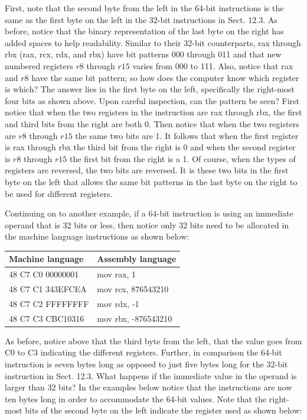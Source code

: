 \documentclass[10pt]{book}
\begin{document}
First, note that the second byte from the left in the 64-bit instructions is the same as the first byte on the left in the 32-bit instructions in Sect. 12.3. As before, notice that the binary representation of the last byte on the right has added spaces to help readability. Similar to their 32-bit counterparts, rax through rbx (rax, rcx, rdx, and rbx) have bit patterns 000 through 011 and that new numbered registers $r 8$ through $r 15$ varies from 000 to 111. Also, notice that rax and $r 8$ have the same bit pattern; so how does the computer know which register is which? The answer lies in the first byte on the left, specifically the right-most four bits as shown above. Upon careful inspection, can the pattern be seen? First notice that when the two registers in the instruction are rax through rbx, the first and third bits from the right are both 0. Then notice that when the two registers are $r 8$ through $r 15$ the same two bits are 1. It follows that when the first register is rax through rbx the third bit from the right is 0 and when the second register is $r 8$ through $r 15$ the first bit from the right is a 1. Of course, when the types of registers are reversed, the two bits are reversed. It is these two bits in the first byte on the left that allows the same bit patterns in the last byte on the right to be used for different registers.

Continuing on to another example, if a 64-bit instruction is using an immediate operand that is 32 bits or less, then notice only 32 bits need to be allocated in the machine language instructions as shown below:

\begin{center}
\begin{tabular}{|l|l|}
\hline
Machine language & Assembly language \\
\hline
48 C7 C0 00000001 & mov rax, 1 \\
\hline
48 C7 C1 343EFCEA & mov rcx, 876543210 \\
\hline
48 C7 C2 FFFFFFFF & mov rdx, -1 \\
\hline
48 C7 C3 CBC10316 & mov rbx, -876543210 \\
\hline
\end{tabular}
\end{center}

As before, notice above that the third byte from the left, that the value goes from C0 to C3 indicating the different registers. Further, in comparison the 64-bit instruction is seven bytes long as opposed to just five bytes long for the 32-bit instruction in Sect. 12.3.
What happens if the immediate value in the operand is larger than 32 bits? In the examples below notice that the instructions are now ten bytes long in order to accommodate the 64-bit values. Note that the right-most bits of the second byte on the left indicate the register used as shown below:
\end{document}
